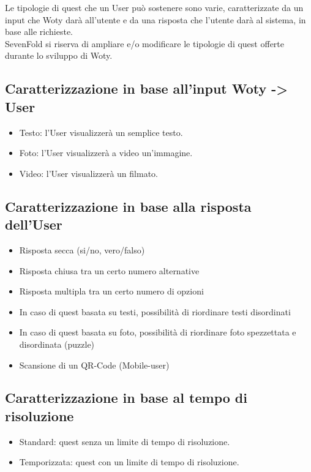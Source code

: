 Le tipologie di quest che un User può sostenere sono varie, caratterizzate da un input che Woty darà all'utente e da una risposta che l'utente darà al sistema, in base alle richieste.\\
SevenFold si riserva di ampliare e/o modificare le tipologie di quest offerte durante lo sviluppo di Woty.

\subsection{Caratterizzazione in base all'input Woty -> User}
\begin{itemize}
\item Testo: l'User visualizzerà un semplice testo.
\item Foto: l'User visualizzerà a video un'immagine.
\item Video: l'User visualizzerà un filmato.
\end{itemize}

\subsection{Caratterizzazione in base alla risposta dell'User}
\begin{itemize}
\item Risposta secca (si/no, vero/falso)
\item Risposta chiusa tra un certo numero alternative
\item Risposta multipla tra un certo numero di opzioni
\item In caso di quest basata su testi, possibilità di riordinare testi disordinati
\item In caso di quest basata su foto, possibilità di riordinare foto spezzettata e disordinata (puzzle)
\item Scansione di un QR-Code (Mobile-user)
\end{itemize}

\subsection{Caratterizzazione in base al tempo di risoluzione}
\begin{itemize}
\item Standard: quest senza un limite di tempo di risoluzione.
\item Temporizzata: quest con un limite di tempo di risoluzione.
\end{itemize}





